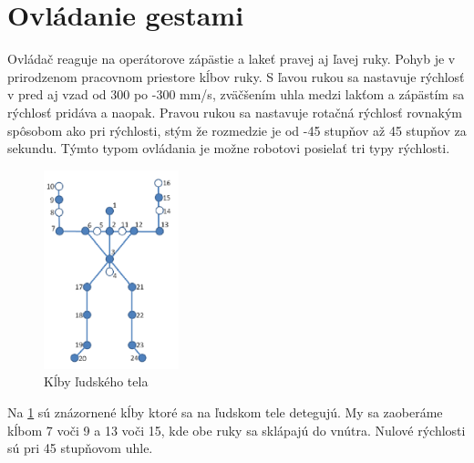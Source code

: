 \section{Ovládanie gestami}
Ovládač reaguje na operátorove zápästie a lakeť pravej aj ľavej ruky. Pohyb je v prirodzenom pracovnom priestore kĺbov ruky. S ľavou rukou sa nastavuje rýchlosť v pred aj vzad od 300 po -300 mm/s, zväčšením uhla medzi lakťom a zápästím sa rýchlosť pridáva a naopak. Pravou rukou sa nastavuje rotačná rýchlosť rovnakým spôsobom ako pri rýchlosti, stým že rozmedzie je od -45 stupňov až 45 stupňov za sekundu. Týmto typom ovládania je možne robotovi posielať tri typy rýchlosti. 

\begin{figure}[!htbp]
	\begin{center}
		\includegraphics[width=0.35\textwidth]{img/skeleton.png}
	\end{center}
	\caption{Kĺby ľudského tela}
	\label{fig:skeleton}
\end{figure}
\newpage
Na \ref{fig:skeleton} sú znázornené kĺby ktoré sa na ľudskom tele detegujú. My sa zaoberáme kĺbom 7 voči 9 a 13 voči 15, kde obe ruky sa sklápajú do vnútra. Nulové rýchlosti sú pri 45 stupňovom uhle.